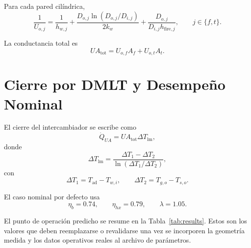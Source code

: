 \documentclass[conference]{IEEEtran}
\begin{document}
Para cada pared cil\'indrica,
\begin{equation}
\frac{1}{U_{o,j}}=
\frac{1}{h_{w,j}}
+\frac{D_{o,j}\ln(D_{o,j}/D_{i,j})}{2k_w}
+\frac{D_{o,j}}{D_{i,j}h_{\mathrm{fire},j}},
\qquad j\in\{f,t\}.
\label{eq:uo}
\end{equation}

La conductancia total es
\begin{equation}
UA_{\mathrm{tot}}=U_{o,f}A_f+U_{o,t}A_t.
\label{eq:uatot}
\end{equation}

\section{Cierre por DMLT y Desempe\~no Nominal}
El cierre del intercambiador se escribe como
\begin{equation}
\dot{Q}_{UA}=UA_{\mathrm{tot}}\Delta T_{\mathrm{lm}},
\label{eq:qua}
\end{equation}
donde
\begin{equation}
\Delta T_{\mathrm{lm}}=
\frac{\Delta T_1-\Delta T_2}
{\ln\left(\Delta T_1/\Delta T_2\right)},
\label{eq:lmtd}
\end{equation}
con
\begin{equation}
\Delta T_1=T_{\mathrm{ad}}-T_{w,i},
\qquad
\Delta T_2=T_{g,o}-T_{s,o}.
\label{eq:dts}
\end{equation}

El caso nominal por defecto usa
\begin{equation}
\eta_b=0.74,
\qquad
\eta_{hx}=0.79,
\qquad
\lambda=1.05.
\label{eq:nominal_eff}
\end{equation}

El punto de operaci\'on predicho se resume en la Tabla~\ref{tab:results}. Estos son los valores que deben reemplazarse o revalidarse una vez se incorporen la geometr\'ia medida y los datos operativos reales al archivo de par\'ametros.
\end{document}
